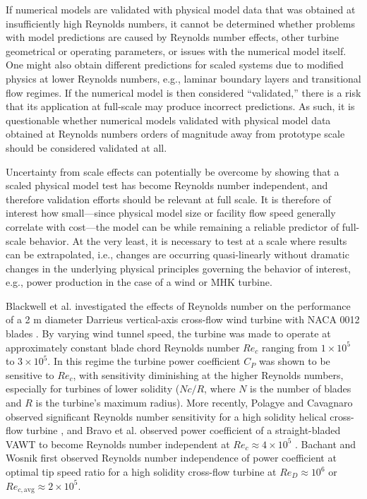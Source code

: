 \documentclass[energies,article,accept,moreauthors,pdftex,12pt,a4paper]{mdpi}
\begin{document}
If numerical models are validated with physical model data that was obtained at
insufficiently high Reynolds numbers, it cannot be determined whether problems
with model predictions are caused by Reynolds number effects, other turbine
geometrical or operating parameters, or issues with the numerical model itself.
One might also obtain different predictions for scaled systems due to modified
physics at lower Reynolds numbers, e.g., laminar boundary layers and
transitional flow regimes. If the numerical model is then considered
``validated,'' there is a risk that its application at full-scale may produce
incorrect predictions. As such, it is questionable whether numerical models
validated with physical model data obtained at Reynolds numbers orders of
magnitude away from prototype scale should be considered validated at all.

Uncertainty from scale effects can potentially be overcome by showing that a
scaled physical model test has become Reynolds number independent, and therefore
validation efforts should be relevant at full scale. It is therefore of interest
how small---since physical model size or facility flow speed generally correlate
with cost---the model can be while remaining a reliable predictor of full-scale
behavior. At the very least, it is necessary to test at a scale where results
can be extrapolated, i.e., changes are occurring quasi-linearly without dramatic
changes in the underlying physical principles governing the behavior of
interest, e.g., power production in the case of a wind or MHK turbine.

Blackwell et al. investigated the effects of Reynolds number on the performance
of a 2 m diameter Darrieus vertical-axis cross-flow wind turbine with NACA 0012
blades \cite{Blackwell1976}. By varying wind tunnel speed, the turbine was made
to operate at approximately constant blade chord Reynolds number $Re_c$ ranging
from $1 \times 10^5$ to $3 \times 10^5$. In this regime the turbine power
coefficient $C_P$ was shown to be sensitive to $Re_c$, with sensitivity
diminishing at the higher Reynolds numbers, especially for turbines of lower
solidity ($Nc/R$, where $N$ is the number of blades and $R$ is the turbine's
maximum radius). More recently, Polagye and Cavagnaro observed significant
Reynolds number sensitivity for a high solidity helical cross-flow turbine
\cite{Polagye2013b}, and Bravo et al. observed power coefficient of a
straight-bladed VAWT to become Reynolds number independent at $Re_c \approx 4
\times 10^5$ \cite{Bravo2007}. Bachant and Wosnik \cite{Bachant2014} first 
observed
Reynolds number independence of power coefficient at optimal tip speed ratio for
a high solidity cross-flow turbine at $Re_D \approx 10^6$ or
$Re_{c,\mathrm{avg}} \approx 2 \times 10^5$.
\end{document}
